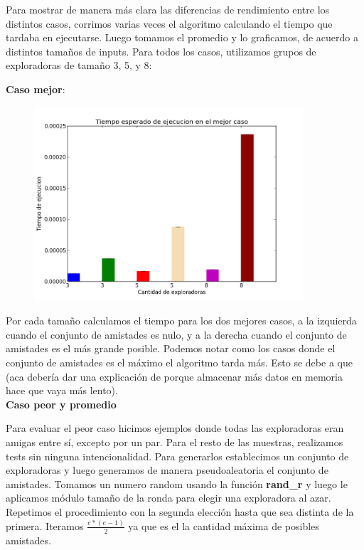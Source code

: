 \documentclass[11pt]{article}
\begin{document}
Para mostrar de manera más clara las diferencias de rendimiento entre los distintos casos, corrimos varias veces 
el algoritmo calculando el tiempo que tardaba en ejecutarse. Luego tomamos el promedio y lo graficamos, de acuerdo a distintos tamaños de inputs.
Para todos los casos, utilizamos grupos de exploradoras de tamaño 3, 5, y 8:

\textbf{Caso mejor}:

      \begin{figure}[h]
        \begin{center}
        \includegraphics[width=100mm,scale=0.5]{mejorCaso}
        \end{center}
        \end{figure}

Por cada tamaño calculamos el tiempo para los dos mejores casos, a la izquierda cuando el conjunto de amistades es 
nulo, y a la derecha cuando el conjunto de amistades es el más grande posible.
Podemos notar como los casos donde el conjunto de amistades es el máximo el algoritmo tarda más. Esto se debe a que 
(aca debería dar una explicación de porque almacenar más datos en memoria hace que vaya más lento).
\\

\textbf{Caso peor y promedio}

Para evaluar el peor caso hicimos ejemplos donde todas las exploradoras eran amigas entre sí, excepto por un par. 
Para el resto de las muestras, realizamos tests sin ninguna intencionalidad. Para generarlos establecimos un conjunto de 
exploradoras y luego generamos de manera pseudoaleatoria el conjunto de amistades. Tomamos un numero random 
usando la función \textbf{rand\_r} y luego le aplicamos módulo tamaño de la ronda para elegir una exploradora al azar. 
Repetimos el procedimiento con la segunda elección hasta que sea distinta de la primera. Iteramos $\frac{e*(e-1)}{2}$
ya que es el la cantidad máxima de posibles amistades.
\end{document}
